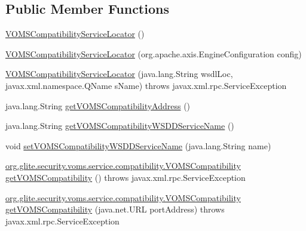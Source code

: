 \subsection*{Public Member Functions}
\begin{DoxyCompactItemize}
\item 
\hyperlink{classorg_1_1glite_1_1security_1_1voms_1_1service_1_1compatibility_1_1VOMSCompatibilityServiceLocator_aaa3f7cb92b4e7f5a76bf5b0879f3163a}{VOMSCompatibilityServiceLocator} ()
\item 
\hyperlink{classorg_1_1glite_1_1security_1_1voms_1_1service_1_1compatibility_1_1VOMSCompatibilityServiceLocator_a21caafafe58edb8bb46c3689620e1314}{VOMSCompatibilityServiceLocator} (org.apache.axis.EngineConfiguration config)
\item 
\hyperlink{classorg_1_1glite_1_1security_1_1voms_1_1service_1_1compatibility_1_1VOMSCompatibilityServiceLocator_a391a207bac9fa7fd864d462b8cc604fc}{VOMSCompatibilityServiceLocator} (java.lang.String wsdlLoc, javax.xml.namespace.QName sName)  throws javax.xml.rpc.ServiceException 
\item 
java.lang.String \hyperlink{classorg_1_1glite_1_1security_1_1voms_1_1service_1_1compatibility_1_1VOMSCompatibilityServiceLocator_a6ae0e7b0000df21f3907e4a5ad195c0b}{getVOMSCompatibilityAddress} ()
\item 
java.lang.String \hyperlink{classorg_1_1glite_1_1security_1_1voms_1_1service_1_1compatibility_1_1VOMSCompatibilityServiceLocator_ab20dc68744a55b30dcaa10caf7d6d0f3}{getVOMSCompatibilityWSDDServiceName} ()
\item 
void \hyperlink{classorg_1_1glite_1_1security_1_1voms_1_1service_1_1compatibility_1_1VOMSCompatibilityServiceLocator_a48d0be26d969caccb7701500f3877cc6}{setVOMSCompatibilityWSDDServiceName} (java.lang.String name)
\item 
\hyperlink{interfaceorg_1_1glite_1_1security_1_1voms_1_1service_1_1compatibility_1_1VOMSCompatibility}{org.glite.security.voms.service.compatibility.VOMSCompatibility} \hyperlink{classorg_1_1glite_1_1security_1_1voms_1_1service_1_1compatibility_1_1VOMSCompatibilityServiceLocator_ae6382603bd094e24a9206cdc31f1f906}{getVOMSCompatibility} ()  throws javax.xml.rpc.ServiceException 
\item 
\hyperlink{interfaceorg_1_1glite_1_1security_1_1voms_1_1service_1_1compatibility_1_1VOMSCompatibility}{org.glite.security.voms.service.compatibility.VOMSCompatibility} \hyperlink{classorg_1_1glite_1_1security_1_1voms_1_1service_1_1compatibility_1_1VOMSCompatibilityServiceLocator_a002deaf23830d35f3e1b711e54b51f2e}{getVOMSCompatibility} (java.net.URL portAddress)  throws javax.xml.rpc.ServiceException 

\end{DoxyCompactItemize}
